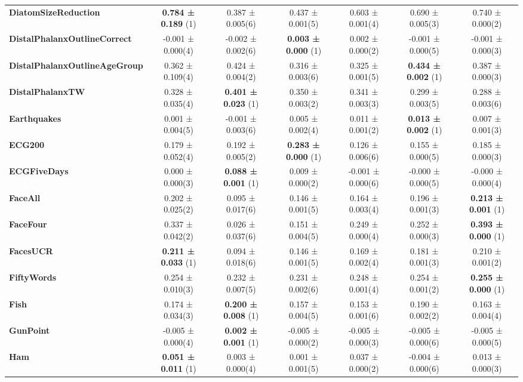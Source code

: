 \begin{table}[ht]
\begin{adjustbox}{width=\textwidth}
\begin{tabular}{lcccccc}
\textbf{DiatomSizeReduction} & \textbf{0.784 ± 0.189} (1) & 0.387 ± 0.005(6) & 0.437 ± 0.001(5) & 0.603 ± 0.001(4) & 0.690 ± 0.005(3) & 0.740 ± 0.000(2) \\
\textbf{DistalPhalanxOutlineCorrect} & -0.001 ± 0.000(4) & -0.002 ± 0.002(6) & \textbf{0.003 ± 0.000} (1) & 0.002 ± 0.000(2) & -0.001 ± 0.000(5) & -0.001 ± 0.000(3) \\
\textbf{DistalPhalanxOutlineAgeGroup} & 0.362 ± 0.109(4) & 0.424 ± 0.004(2) & 0.316 ± 0.003(6) & 0.325 ± 0.001(5) & \textbf{0.434 ± 0.002} (1) & 0.387 ± 0.000(3) \\
\textbf{DistalPhalanxTW} & 0.328 ± 0.035(4) & \textbf{0.401 ± 0.023} (1) & 0.350 ± 0.003(2) & 0.341 ± 0.003(3) & 0.299 ± 0.003(5) & 0.288 ± 0.003(6) \\
\textbf{Earthquakes} & 0.001 ± 0.004(5) & -0.001 ± 0.003(6) & 0.005 ± 0.002(4) & 0.011 ± 0.001(2) & \textbf{0.013 ± 0.002} (1) & 0.007 ± 0.001(3) \\
\textbf{ECG200} & 0.179 ± 0.052(4) & 0.192 ± 0.005(2) & \textbf{0.283 ± 0.000} (1) & 0.126 ± 0.006(6) & 0.155 ± 0.000(5) & 0.185 ± 0.000(3) \\
\textbf{ECGFiveDays} & 0.000 ± 0.000(3) & \textbf{0.088 ± 0.001} (1) & 0.009 ± 0.000(2) & -0.001 ± 0.000(6) & -0.000 ± 0.000(5) & -0.000 ± 0.000(4) \\
\textbf{FaceAll} & 0.202 ± 0.025(2) & 0.095 ± 0.017(6) & 0.146 ± 0.001(5) & 0.164 ± 0.003(4) & 0.196 ± 0.001(3) & \textbf{0.213 ± 0.001} (1) \\
\textbf{FaceFour} & 0.337 ± 0.042(2) & 0.026 ± 0.037(6) & 0.151 ± 0.004(5) & 0.249 ± 0.000(4) & 0.252 ± 0.000(3) & \textbf{0.393 ± 0.000} (1) \\
\textbf{FacesUCR} & \textbf{0.211 ± 0.033} (1) & 0.094 ± 0.018(6) & 0.146 ± 0.001(5) & 0.169 ± 0.002(4) & 0.181 ± 0.001(3) & 0.210 ± 0.001(2) \\
\textbf{FiftyWords} & 0.254 ± 0.010(3) & 0.232 ± 0.007(5) & 0.231 ± 0.002(6) & 0.248 ± 0.001(4) & 0.254 ± 0.001(2) & \textbf{0.255 ± 0.000} (1) \\
\textbf{Fish} & 0.174 ± 0.034(3) & \textbf{0.200 ± 0.008} (1) & 0.157 ± 0.004(5) & 0.153 ± 0.001(6) & 0.190 ± 0.002(2) & 0.163 ± 0.004(4) \\
\textbf{GunPoint} & -0.005 ± 0.000(4) & \textbf{0.002 ± 0.001} (1) & -0.005 ± 0.000(2) & -0.005 ± 0.000(3) & -0.005 ± 0.000(6) & -0.005 ± 0.000(5) \\
\textbf{Ham} & \textbf{0.051 ± 0.011} (1) & 0.003 ± 0.000(4) & 0.001 ± 0.001(5) & 0.037 ± 0.000(2) & -0.004 ± 0.000(6) & 0.013 ± 0.000(3) \\

\end{tabular}
\end{adjustbox}
\end{table}
